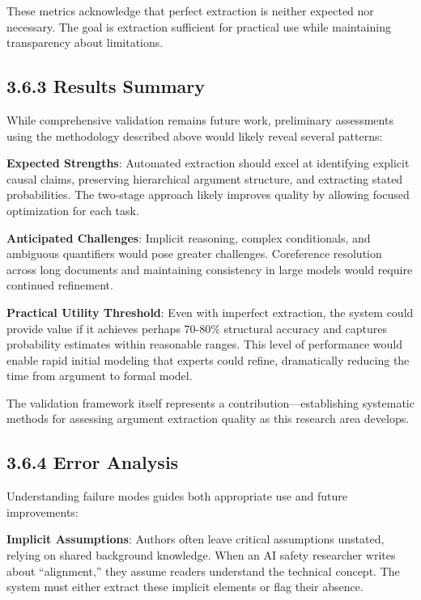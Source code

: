 \documentclass[
  11pt,
  letterpaper,
]{book}
\begin{document}
These metrics acknowledge that perfect extraction is neither expected
nor necessary. The goal is extraction sufficient for practical use while
maintaining transparency about limitations.

\subsection{3.6.3 Results Summary}\label{sec-validation-results}

While comprehensive validation remains future work, preliminary
assessments using the methodology described above would likely reveal
several patterns:

\textbf{Expected Strengths}: Automated extraction should excel at
identifying explicit causal claims, preserving hierarchical argument
structure, and extracting stated probabilities. The two-stage approach
likely improves quality by allowing focused optimization for each task.

\textbf{Anticipated Challenges}: Implicit reasoning, complex
conditionals, and ambiguous quantifiers would pose greater challenges.
Coreference resolution across long documents and maintaining consistency
in large models would require continued refinement.

\textbf{Practical Utility Threshold}: Even with imperfect extraction,
the system could provide value if it achieves perhaps 70-80\% structural
accuracy and captures probability estimates within reasonable ranges.
This level of performance would enable rapid initial modeling that
experts could refine, dramatically reducing the time from argument to
formal model.

The validation framework itself represents a contribution---establishing
systematic methods for assessing argument extraction quality as this
research area develops.

\subsection{3.6.4 Error Analysis}\label{sec-error-analysis}

Understanding failure modes guides both appropriate use and future
improvements:

\textbf{Implicit Assumptions}: Authors often leave critical assumptions
unstated, relying on shared background knowledge. When an AI safety
researcher writes about ``alignment,'' they assume readers understand
the technical concept. The system must either extract these implicit
elements or flag their absence.
\end{document}
